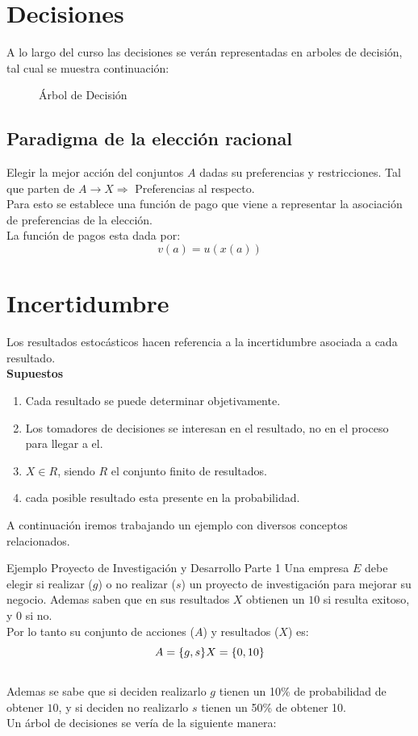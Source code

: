\documentclass[12pt]{article}
\begin{document}
\section{Decisiones}
A lo largo del curso las decisiones se verán representadas en arboles de decisión, tal cual se muestra continuación: 
\begin{figure} [H]
    \centering
    
    \caption{Árbol de Decisión}
    \label{fig:placeholder}
\end{figure}
\subsection{Paradigma de la elección racional}
Elegir la mejor acción del conjuntos $A$ dadas su preferencias y restricciones. 
Tal que parten de $A\rightarrow X \Rightarrow$ Preferencias al respecto. \\
Para esto se establece una función de pago que viene a representar la asociación de preferencias de la elección. \\
La función de pagos esta dada por: $$v(a)=u(x(a))$$

\section{Incertidumbre}
Los resultados estocásticos hacen referencia a la incertidumbre asociada a cada resultado. \\
\textbf{Supuestos}
\begin{enumerate}
    \item Cada resultado se puede determinar objetivamente. 
    \item Los tomadores de decisiones se interesan en el resultado, no en el proceso para llegar a el. 
    \item $X\in R$, siendo $R$ el conjunto finito de resultados. 
    \item cada posible resultado esta presente en la probabilidad. 
\end{enumerate}
A continuación iremos trabajando un ejemplo con diversos conceptos relacionados. 
\begin{ejemplo}{Ejemplo Proyecto de Investigación y Desarrollo Parte 1}
    Una empresa $E$ debe elegir si realizar ($g$) o no realizar ($s$) un proyecto de investigación para mejorar su negocio. Ademas saben que en sus resultados $X$ obtienen un $10$ si resulta exitoso, y $0$ si no. \\
    Por lo tanto su conjunto de acciones ($A$) y resultados ($X$) es:
    $$A=\{g,s\}\\X=\{0,10\}$$\\
    Ademas se sabe que si deciden realizarlo $g$ tienen un 10\% de probabilidad de obtener $10$, y si deciden no realizarlo $s$ tienen un 50\% de obtener 10. \\
    Un árbol de decisiones se vería de la siguiente manera: \\
    \begin{figure} [H]
        \centering
        
        \label{fig:placeholder}
    \end{figure}
\end{ejemplo}
\end{document}
